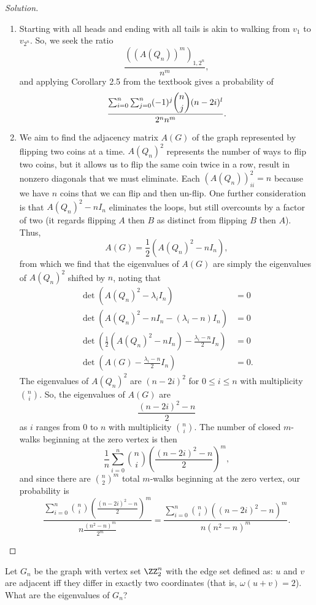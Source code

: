 \documentclass[11pt]{scrartcl}
\begin{document}
\begin{proof}[Solution]
\begin{enumerate}[(i.)]
    \item Starting with all heads and ending with all tails is akin to walking from $v_1$ to $v_{2^n}$. So, we seek the ratio \[\frac{((A(Q_n))^m)_{1,2^n}}{n^m},\] and applying Corollary 2.5 from the textbook gives a probability of \[\frac{\sum_{i=0}^n\sum_{j=0}^n(-1)^j\dbinom{n}{j}(n-2i)^l}{2^nn^m}.\]
    \item We aim to find the adjacency matrix $A(G)$ of the graph represented by flipping two coins at a time. $A(Q_n)^2$ represents the number of ways to flip two coins, but it allows us to flip the same coin twice in a row, result in nonzero diagonals that we must eliminate. Each $(A(Q_n))^2_{ii}=n$ because we have $n$ coins that we can flip and then un-flip. One further consideration is that $A(Q_n)^2-nI_n$ eliminates the loops, but still overcounts by a factor of two (it regards flipping $A$ then $B$ as distinct from flipping $B$ then $A$). Thus, \[A(G)=\frac12(A(Q_n)^2-nI_n),\] from which we find that the eigenvalues of $A(G)$ are simply the eigenvalues of $A(Q_n)^2$ shifted by $n$, noting that
    \begin{align*}
        \det(A(Q_n)^2-\lambda_iI_n)&=0\\
        \det(A(Q_n)^2-nI_n-(\lambda_i-n)I_n)&=0\\
        \det\left(\frac12(A(Q_n)^2-nI_n)-\frac{\lambda_i-n}{2}I_n\right)&=0\\
        \det\left(A(G)-\frac{\lambda_i-n}{2}I_n\right)&=0.
    \end{align*}
    The eigenvalues of $A(Q_n)^2$ are $(n-2i)^2$ for $0\leq i\leq n$ with multiplicity $\binom n i$. So, the eigenvalues of $A(G)$ are \[\frac{(n-2i)^2-n}{2}\] as $i$ ranges from $0$ to $n$ with multiplicity $\binom n i$. The number of closed $m$-walks beginning at the zero vertex is then \[\frac{1}{n}\sum_{i=0}^n\binom n i\left(\frac{(n-2i)^2-n}{2}\right)^m,\] and since there are $\binom{n}{2}^m$ total $m$-walks beginning at the zero vertex, our probability is \[\frac{\sum_{i=0}^n\binom n i\left(\frac{(n-2i)^2-n}{2}\right)^m}{n\frac{(n^2-n)^m}{2^m}}=\frac{\sum_{i=0}^n\binom n i ((n-2i)^2-n)^m}{n(n^2-n)^m}.\]
\end{enumerate}
\end{proof}
\begin{problem}
    Let $G_n$ be the graph with vertex set $\ZZ_2^n$ with the edge set defined as: $u$ and $v$ are adjacent iff they differ in exactly two coordinates (that is, $\omega(u+v)=2$). What are the eigenvalues of $G_n$?
    
\end{problem}
\end{document}

